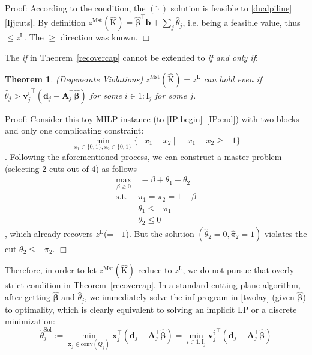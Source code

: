 \documentclass[journal]{IEEEtran}
\newtheorem{theorem}{Theorem}
\newcommand{\boxend}{\hfill $\Box$}
\newcommand{\theoremref}[1]{Theorem~\ref{#1}}
\begin{document}
Proof: According to the condition, the $(\hat{\cdot})$ solution is feasible to \eqref{dualpiline}\eqref{Ijjcuts}.
By definition
\( z^\mathrm{Mst}(\hat{\mathrm{K}}) = \hat{\boldsymbol{\beta}}^\top \mathbf{b} + \sum_j \hat{\theta}_j \),
i.e. being a feasible value, thus $\le z^\mathrm{L}$.
The $\ge$ direction was known. \boxend
\par
The \textit{if} in \theoremref{recovercap} cannot be extended to \textit{if and only if}:
\begin{theorem}(Degenerate Violations)
    \( z^\mathrm{Mst}(\hat{\mathrm{K}}) = z^\mathrm{L} \) \textit{can} hold even if
    \( \hat{\theta}_j > {\mathbf{v}_j^i}^\top (\mathbf{d}_j - \mathbf{A}_j^\top \hat{\boldsymbol{\beta}}) \) for some  $i \in 1\!:\!\mathrm{I}_j$  for some $j$.
\end{theorem}
Proof: Consider this toy MILP instance (to \eqref{IP:begin}--\eqref{IP:end})
with two blocks and only one complicating constraint:
\begin{equation}
    \min_{x_1 \in \{0, 1\}, x_2 \in \{0, 1\}} \{-x_1-x_2 \ | \ -x_1-x_2 \ge -1\}
\end{equation}
. Following the aforementioned process, we can construct a master problem (selecting 2 cuts out of 4) as follows
\begin{align}
    \max_{\beta \ge 0} & \ -\beta + \theta_1 + \theta_2 \\
    \text{s.t. } & \pi_1 = \pi_2 = 1 - \beta \\
    & \theta_1 \le -\pi_1 \\
    & \theta_2 \le 0
\end{align}
, which already recovers $z^\mathrm{L}$(=\,$-1$).
But the solution $(\hat{\theta}_2 = 0, \hat{\pi}_2 = 1)$ violates the
cut $\theta_2 \le -\pi_2$. \boxend 
\par
Therefore, in order to let $z^\mathrm{Mst}(\hat{\mathrm{K}})$ reduce to $z^\mathrm{L}$, we do not pursue that overly strict condition in Theorem~\ref{recovercap}.
In a standard cutting plane algorithm, after getting $\hat{\boldsymbol{\beta}}$ and $\hat{\theta}_j$, we immediately solve the inf-program in \eqref{twolay} (given $\hat{\boldsymbol{\beta}}$) to optimality, which is clearly equivalent to solving an implicit LP or a discrete minimization:
\begin{equation}\label{implicitlpj}
    \hat{\theta}_j^\textrm{Sol} := \min_{\mathbf{x}_j \in \text{conv}(Q_j)} \mathbf{x}_j^\top (\mathbf{d}_j - \mathbf{A}_j^\top \hat{\boldsymbol{\beta}}) =
    \min_{i \in 1:\mathrm{I}_j} {\mathbf{v}_j^i}^\top (\mathbf{d}_j - \mathbf{A}_j^\top \hat{\boldsymbol{\beta}})
\end{equation}
\end{document}
